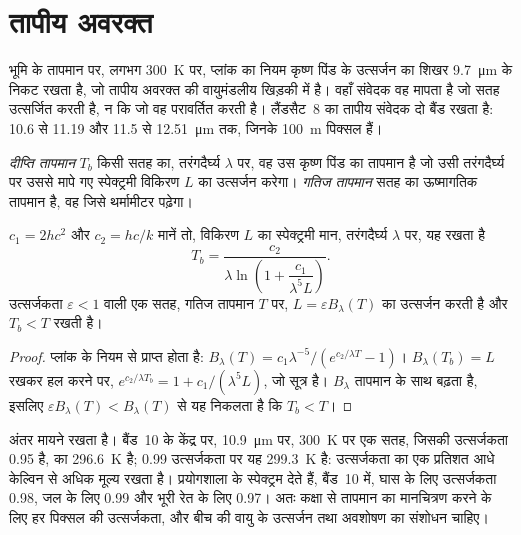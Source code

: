 \section{तापीय अवरक्त}\label{sec:b3:remote-sensing-gis:thermal}

भूमि के तापमान पर, लगभग \qty{300}{K} पर, प्लांक का नियम
कृष्ण पिंड के उत्सर्जन का शिखर \qty{9.7}{\micro\metre} के निकट रखता है, जो तापीय
अवरक्त की वायुमंडलीय खिड़की में है। वहाँ संवेदक वह मापता है जो
सतह उत्सर्जित करती है, न कि जो वह परावर्तित करती है। लैंडसैट~8 का तापीय संवेदक
दो बैंड रखता है: 10.6 से 11.19 और 11.5 से \qty{12.51}{\micro\metre} तक, जिनके
\qty{100}{m} पिक्सल हैं।

\begin{definition}[दीप्ति तापमान]\label{def:b3:remote-sensing-gis:brightness}
\emph{दीप्ति तापमान} $T_b$ किसी सतह का, तरंगदैर्घ्य $\lambda$ पर,
वह उस कृष्ण पिंड का तापमान है जो
उसी तरंगदैर्घ्य पर उससे मापे गए स्पेक्ट्रमी विकिरण $L$ का उत्सर्जन करेगा।
\emph{गतिज तापमान} सतह का ऊष्मागतिक
तापमान है, वह जिसे थर्मामीटर पढ़ेगा।
\end{definition}

\begin{proposition}[विकिरण से दीप्ति तापमान]\label{prop:b3:remote-sensing-gis:planck-inversion}
$c_1 = 2hc^2$ और $c_2 = hc/k$ मानें तो, विकिरण $L$ का स्पेक्ट्रमी मान,
तरंगदैर्घ्य $\lambda$ पर, यह  रखता है
\[
T_b = \frac{c_2}{\lambda \ln\!\left(1 + \dfrac{c_1}{\lambda^5 L}\right)} .
\]
उत्सर्जकता $\varepsilon < 1$ वाली एक सतह, गतिज तापमान $T$ पर,
$L = \varepsilon B_\lambda(T)$ का उत्सर्जन करती है और $T_b < T$ रखती है।
\end{proposition}

\begin{proof}
प्लांक के नियम से प्राप्त होता है: $B_\lambda(T) = c_1\lambda^{-5}/(e^{c_2/\lambda T} -
1)$। $B_\lambda(T_b) = L$ रखकर हल करने पर, $e^{c_2/\lambda T_b} = 1 +
c_1/(\lambda^5L)$, जो सूत्र है। $B_\lambda$ तापमान के साथ बढ़ता है, इसलिए
$\varepsilon B_\lambda(T) < B_\lambda(T)$ से यह निकलता है कि $T_b < T$।
\end{proof}

अंतर मायने रखता है। बैंड~10 के केंद्र पर, \qty{10.9}{\micro\metre} पर,
\qty{300}{K} पर एक सतह, जिसकी उत्सर्जकता 0.95 है, का  \qty{296.6}{K} है; 0.99 उत्सर्जकता पर यह \qty{299.3}{K} है: उत्सर्जकता का
एक प्रतिशत आधे केल्विन से अधिक मूल्य रखता है। प्रयोगशाला के स्पेक्ट्रम देते हैं,
बैंड~10 में, घास के लिए उत्सर्जकता 0.98, जल के लिए 0.99 और
भूरी रेत के लिए 0.97। अतः कक्षा से तापमान का मानचित्रण करने के लिए
हर पिक्सल की उत्सर्जकता, और बीच की वायु के उत्सर्जन तथा
अवशोषण का संशोधन चाहिए।

